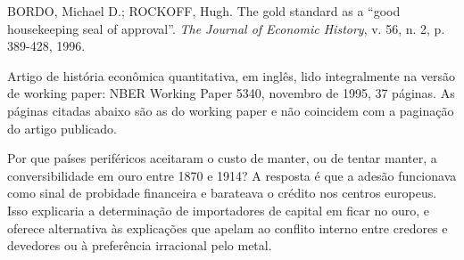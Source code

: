
\begin{identificacao}
BORDO, Michael D.; ROCKOFF, Hugh. The gold standard as a ``good housekeeping
seal of approval''. \emph{The Journal of Economic History}, v. 56, n. 2,
p. 389-428, 1996.

Artigo de história econômica quantitativa, em inglês, lido integralmente na
versão de working paper: NBER Working Paper 5340, novembro de 1995, 37 páginas.
As páginas citadas abaixo são as do working paper e não coincidem com a
paginação do artigo publicado.
\end{identificacao}

Por que países periféricos aceitaram o custo de manter, ou de tentar manter, a
conversibilidade em ouro entre 1870 e 1914? A resposta é que a adesão
funcionava como sinal de probidade financeira e barateava o crédito nos centros
europeus. Isso explicaria a determinação de importadores de capital em ficar no
ouro, e oferece alternativa às explicações que apelam ao conflito interno entre
credores e devedores ou à preferência irracional pelo metal.

